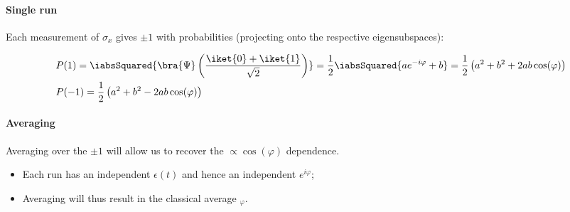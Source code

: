               \newpage
              \paragraph{Single run}  Each measurement  of $  \sigma_x $ gives  $ \pm1  $ with
              probabilities (projecting onto the respective eigensubspaces):
  
              \begin{equation}\label{eq:linrelax_8}
                \begin{aligned}
                  &P(1) = \iabsSquared{\bra{\Psi}\left(\frac{\iket{0} + \iket{1}}{\sqrt{2}}\right)} = \frac{1}{{2}}\iabsSquared{ae^{-i\varphi} + b} = \frac{1}{2}\left({a}^2 + {b}^2 + 2ab\cos(\varphi) \right)\\
                  & P(-1) = \frac{1}{2}\left(a^2 + b^2 - 2ab\cos(\varphi)\right)
                \end{aligned}
              \end{equation}
    
  
              \paragraph{Averaging} Averaging over the $ \pm 1  $ will allow us to recover the
              \isigmax $ \propto \cos(\varphi) $ dependence.
              \begin{itemize}
              \item  Each run  has an  independent $  \epsilon(t) $  and hence  an independent
                $ e^{i\varphi} $;
              \item    Averaging    will    thus    result   in    the    classical    average
                $ _\varphi $.
              \end{itemize}

  
